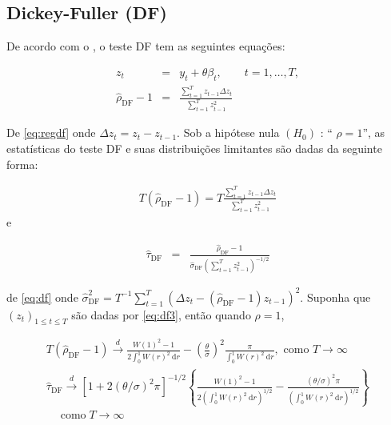 \subsection{Dickey-Fuller (DF)}

De acordo com o , o teste DF tem as seguintes equações:

\begin{eqnarray}
	z_t&=& y_t+\theta \beta_t, \qquad t=1,\ldots, T, \label{eq:df3}\\	
	\hat{\rho}_{\mathrm{DF}}-1&=&\frac{\sum_{t=1}^T z_{t-1} \Delta z_t}{\sum_{t=1}^T z_{t-1}^2} \label{eq:regdf}
\end{eqnarray}

De \eqref{eq:regdf} onde $\Delta z_t=z_t-z_{t-1}$. Sob a hipótese nula $\left(H_0\right)$ : `` $\rho=1$'', as estatísticas do teste DF e suas distribuições limitantes são dadas da seguinte forma:


\begin{eqnarray}
	T\left(\hat{\rho}_{\mathrm{DF}}-1\right)=T \frac{\sum_{t=1}^T z_{t-1} \Delta z_t}{\sum_{t=1}^T z_{t-1}^2}
\end{eqnarray}
e


\begin{eqnarray}
	\hat{\tau}_{\mathrm{DF}}&=&\frac{\hat{\rho}_{\mathrm{DF}}-1}{\hat{\sigma}_{\mathrm{DF}}\left(\sum_{t=1}^T z_{t-1}^2\right)^{-1 / 2}} \label{eq:df}
\end{eqnarray}

\noindent de \eqref{eq:df} onde $\hat{\sigma}_{\mathrm{DF}}^2=T^{-1} \sum_{t=1}^T\left(\Delta z_t-\left(\hat{\rho}_{\mathrm{DF}}-1\right) z_{t-1}\right)^2 .$
Suponha que $\left(z_t\right)_{1 \leq t \leq T}$ são dadas por \eqref{eq:df3}, então quando $\rho=1$,


\begin{eqnarray}
	T\left(\hat{\rho}_{\mathrm{DF}}-1\right) \stackrel{d}{\longrightarrow} \frac{W(1)^2-1}{2 \int_0^1 W(r)^2 \mathrm{~d} r}-\left(\frac{\theta}{\sigma}\right)^2 \frac{\pi}{\int_0^1 W(r)^2 \mathrm{~d} r}, \text { como } T \rightarrow \infty \\
	\hat{\tau}_{\mathrm{DF}} \stackrel{d}{\longrightarrow}\left[1+2(\theta / \sigma)^2 \pi\right]^{-1 / 2}\left\{\frac{W(1)^2-1}{2\left(\int_0^1 W(r)^2 \mathrm{~d} r\right)^{1 / 2}}-\frac{(\theta / \sigma)^2 \pi}{\left(\int_0^1 W(r)^2 \mathrm{~d} r\right)^{1 / 2}}\right\} \\
	\quad \operatorname{como} T \rightarrow \infty\label{eq:df2}
\end{eqnarray}

